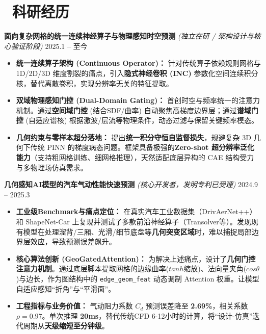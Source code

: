 \documentclass[11pt]{article}
\begin{document}

\section{\makebox[\widthof{\faUsers}][c]{\color{CVBlue}\faUsers}\ 
科研经历}

\textbf{面向复杂网格的统一连续神经算子与物理感知时空预测} 
\textit{(独立在研 / 架构设计与核心验证阶段)} 
\hfill 2025.1 -- 至今
\begin{itemize}
    \item \textbf{统一连续算子架构 (Continuous Operator)：} 针对传统算子依赖规则网格与 1D/2D/3D 维度割裂的痛点，引入\textbf{隐式神经卷积 (INC)} 参数化空间连续积分核，替代离散卷积，实现分辨率无关的特征提取。
    \item \textbf{双域物理感知门控 (Dual-Domain Gating)：} 首创时空与频率统一的注意力机制。通过\textbf{空间域门控} (结合SDF/曲率) 自动聚焦高梯度边界层；通过\textbf{谱域门控} (自适应谱核) 根据激波/层流等物理条件，动态过滤与保留关键频率模态。
    \item \textbf{几何约束与零样本超分落地：} 提出\textbf{统一积分守恒自监督损失}，规避复杂 3D 几何下传统 PINN 的梯度病态问题。框架具备极强的\textbf{Zero-shot 超分辨率泛化能力}（支持粗网格训练、细网格推理），天然适配底层异构的 CAE 结构受力与多物理场仿真需求。
\end{itemize}


\textbf{几何感知AI模型的汽车气动性能快速预测} 
\textit{(核心开发者，发明专利已受理)} 
\hfill 2024.9 -- 2025.3
\begin{itemize}
    \item \textbf{工业级Benchmark与痛点定位：} 在真实汽车工业数据集（DrivAerNet++）和 ShapeNet-Car 上复现并测试了多款前沿神经算子（Transolver等）。发现现有模型在处理溜背/三厢、光滑/细节底盘等\textbf{几何突变区域}时，难以捕捉局部边界层效应，导致预测误差飙升。
    \item \textbf{核心算法创新 (GeoGatedAttention)：} 为解决上述痛点，设计了\textbf{几何门控注意力机制}。通过底层脚本提取网格的边缘曲率($tanh$缩放)、法向量夹角($cos\theta$)与边长，作为图结构中的 \texttt{edge\_geom\_feat} 动态调制 Attention 权重。让模型自适应感知“折角”与“平滑面”。
    \item \textbf{工程指标与业务价值：} 气动阻力系数 $C_d$ 预测误差降至 \textbf{2.69\%}，相关系数 $\rho = 0.97$。单次推理 \textbf{20ms}，替代传统CFD 6-12小时的计算，将“设计-仿真”迭代周期从\textbf{天级缩短至分钟级}。
\end{itemize}
\end{document}
